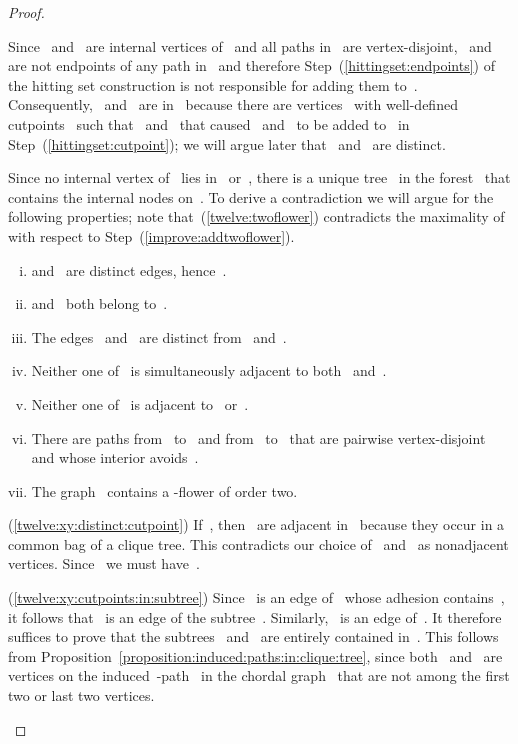\begin{proof}
\begin{claimproof}
Since~ and~ are internal vertices of~ and all paths in~ are vertex-disjoint,~ and~ are not endpoints of any path in~ and therefore Step~(\ref{hittingset:endpoints}) of the hitting set construction is not responsible for adding them to~. Consequently,~ and~ are in~ because there are vertices~ with well-defined cutpoints~ such that~ and~ that caused~ and~ to be added to~ in Step~(\ref{hittingset:cutpoint}); we will argue later that~ and~ are distinct.

Since no internal vertex of~ lies in~ or~, there is a unique tree~ in the forest~ that contains the internal nodes on~. To derive a contradiction we will argue for the following properties; note that~(\ref{twelve:twoflower}) contradicts the maximality of~ with respect to Step~(\ref{improve:addtwoflower}).

\begin{enumerate}[(i)]
	\item  and~ are distinct edges, hence~.\label{twelve:xy:distinct:cutpoint}
	\item  and~ both belong to~.\label{twelve:xy:cutpoints:in:subtree}
	\item The edges~ and~ are distinct from~ and~.\label{twelve:primetost:distinct:cutpoint}
	\item Neither one of~ is simultaneously adjacent to both~ and~.\label{twelve:prime:not:both:st}
	\item Neither one of~ is adjacent to~ or~.\label{twelve:prime:not:one:st}
	\item There are paths from~ to~ and from~ to~ that are pairwise vertex-disjoint and whose interior avoids~.\label{twelve:twopaths}
	\item The graph~ contains a -flower of order two.\label{twelve:twoflower}
\end{enumerate}

(\ref{twelve:xy:distinct:cutpoint}) If~, then~ are adjacent in~ because they occur in a common bag of a clique tree. This contradicts our choice of~ and~ as nonadjacent vertices. Since~ we must have~.

(\ref{twelve:xy:cutpoints:in:subtree}) Since~ is an edge of~ whose adhesion contains~, it follows that~ is an edge of the subtree~. Similarly,~ is an edge of~. It therefore suffices to prove that the subtrees~ and~ are entirely contained in~. This follows from Proposition~\ref{proposition:induced:paths:in:clique:tree}, since both~ and~ are vertices on the induced~-path~ in the chordal graph~ that are not among the first two or last two vertices.


\end{claimproof}
\end{proof}
